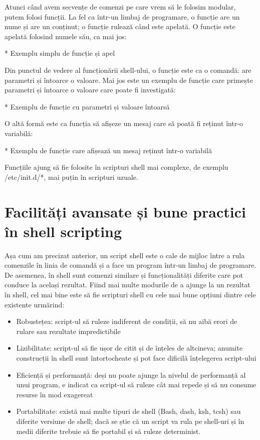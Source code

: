 Atunci când avem secvențe de comenzi pe care vrem să le folosim modular, putem
folosi funcții. La fel ca într-un limbaj de programare, o funcție are un nume și
are un conținut; o funcție rulează când este apelată. O funcție este apelată
folosind numele său, ca mai jos:

* Exemplu simplu de funcție și apel

Din punctul de vedere al funcționării shell-ului, o funcție este ca o comandă:
are parametri și întoarce o valoare. Mai jos este un exemplu de funcție care
primește parametri și întoarce o valoare care poate fi investigată:

* Exemplu de funcție cu parametri și valoare întoarsă

O altă formă este ca funcția să afișeze un mesaj care să poată fi reținut într-o
variabilă:

* Exemplu de funcție care afișează un mesaj reținut într-o variabilă

Funcțiile ajung să fie folosite în scripturi shell mai complexe, de exemplu
/etc/init.d/*, mai puțin în scripturi uzuale.

\section{Facilități avansate și bune practici în shell scripting}
\label{sec:script-advancedfunc}

Așa cum am precizat anterior, un script shell este o cale de mijloc între a rula
comenzile în linia de comandă și a face un program într-un limbaj de programare.
De asemenea, în shell sunt comenzi similare și funcționalități diferite care pot
conduce la același rezultat. Fiind mai multe modurile de a ajunge la un rezultat
în shell, cel mai bine este să fie scripturi shell cu cele mai bune opțiuni
dintre cele existente urmărind:

\begin{itemize}
	\item Robustețea: script-ul să ruleze indiferent de condiții, să nu aibă
		erori de rulare sau rezultate impredictibile
	\item Lizibilitate: script-ul să fie ușor de citit și de înțeles de
		altcineva; anumite construcții în shell sunt întortocheate și
		pot face dificilă înțelegerea script-ului
	\item Eficiență și performanță: deși nu poate ajunge la nivelul de
		performanță al unui program, e indicat ca script-ul să ruleze
		cât mai repede și să nu consume resurse în mod exagereat
	\item Portabilitate: există mai multe tipuri de shell (Bash, dash, ksh,
		tcsh) sau diferite versiune de shell; dacă se știe că un script
		va rula pe shell-uri și în medii diferite trebuie să fie
		portabil și să ruleze determinist.
\end{itemize}

